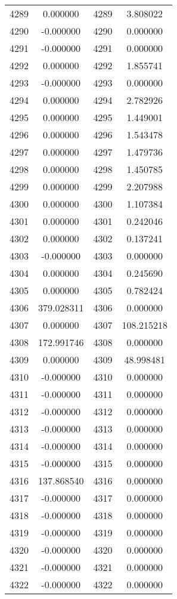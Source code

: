 \documentclass[12pt]{article}
\begin{document}
\begin{longtable}{@{}cccc@{}}
4289 & 0.000000 & 4289 & 3.808022 \\
4290 & -0.000000 & 4290 & 0.000000 \\
4291 & -0.000000 & 4291 & 0.000000 \\
4292 & 0.000000 & 4292 & 1.855741 \\
4293 & -0.000000 & 4293 & 0.000000 \\
4294 & 0.000000 & 4294 & 2.782926 \\
4295 & 0.000000 & 4295 & 1.449001 \\
4296 & 0.000000 & 4296 & 1.543478 \\
4297 & 0.000000 & 4297 & 1.479736 \\
4298 & 0.000000 & 4298 & 1.450785 \\
4299 & 0.000000 & 4299 & 2.207988 \\
4300 & 0.000000 & 4300 & 1.107384 \\
4301 & 0.000000 & 4301 & 0.242046 \\
4302 & 0.000000 & 4302 & 0.137241 \\
4303 & -0.000000 & 4303 & 0.000000 \\
4304 & 0.000000 & 4304 & 0.245690 \\
4305 & 0.000000 & 4305 & 0.782424 \\
4306 & 379.028311 & 4306 & 0.000000 \\
4307 & 0.000000 & 4307 & 108.215218 \\
4308 & 172.991746 & 4308 & 0.000000 \\
4309 & 0.000000 & 4309 & 48.998481 \\
4310 & -0.000000 & 4310 & 0.000000 \\
4311 & -0.000000 & 4311 & 0.000000 \\
4312 & -0.000000 & 4312 & 0.000000 \\
4313 & -0.000000 & 4313 & 0.000000 \\
4314 & -0.000000 & 4314 & 0.000000 \\
4315 & -0.000000 & 4315 & 0.000000 \\
4316 & 137.868540 & 4316 & 0.000000 \\
4317 & -0.000000 & 4317 & 0.000000 \\
4318 & -0.000000 & 4318 & 0.000000 \\
4319 & -0.000000 & 4319 & 0.000000 \\
4320 & -0.000000 & 4320 & 0.000000 \\
4321 & -0.000000 & 4321 & 0.000000 \\
4322 & -0.000000 & 4322 & 0.000000 \\

\end{longtable}
\end{document}
